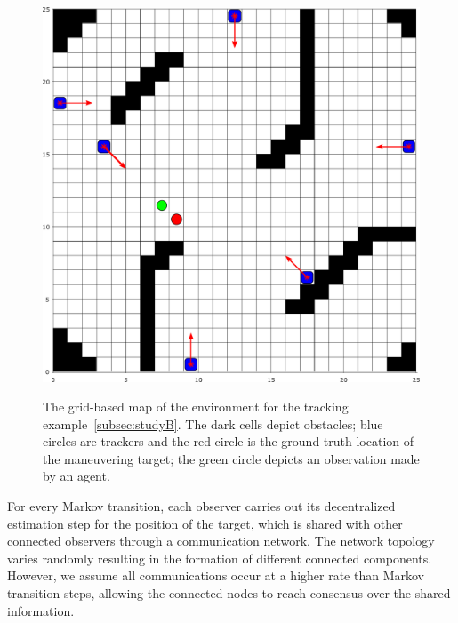 \documentclass[journal]{IEEEtran}
\theoremstyle{remark}
\theoremstyle{definition}
\begin{document}
\begin{figure}[t]
	\centering
	{\includegraphics[width=.8\columnwidth]{./exp1_Corrected2.pdf}}
    \caption{The grid-based map of the environment for the tracking
    example~\ref{subsec:studyB}. The dark cells depict obstacles; blue circles
    are trackers and the red circle is the ground truth location of the
    maneuvering target; the green circle depicts an observation made by an
    agent.\label{fig:exp1}}
\end{figure}


For every Markov transition, each observer carries out its decentralized 
estimation step for the position of the target, which is shared with other 
connected observers through a communication network. The network topology
varies randomly resulting in the formation of different connected
components. However, we assume all communications occur at a higher rate than
Markov transition steps, allowing the connected nodes to reach consensus
over the shared information.
\end{document}
